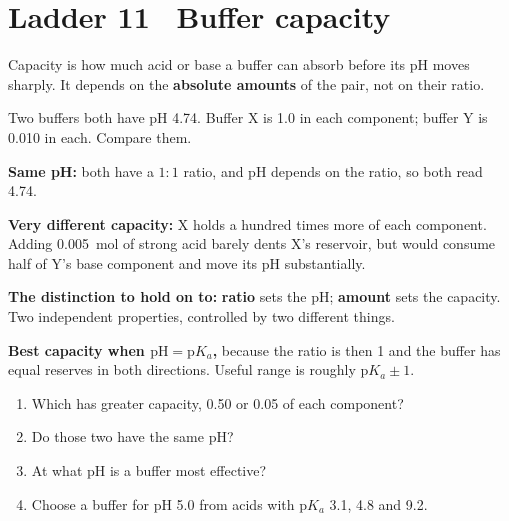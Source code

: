 \documentclass{apchem-worksheet}
\begin{document}
\section*{\sffamily Ladder 11 \textbullet\ Buffer capacity}

Capacity is how much acid or base a buffer can absorb before its pH moves
sharply. It depends on the \textbf{absolute amounts} of the pair, not on
their ratio.

\begin{workedexample}
Two buffers both have pH \num{4.74}. Buffer X is \SI{1.0}{\Molar} in each
component; buffer Y is \SI{0.010}{\Molar} in each. Compare them.

\textbf{Same pH:} both have a $1\!:\!1$ ratio, and pH depends on the
ratio, so both read \num{4.74}.

\textbf{Very different capacity:} X holds a hundred times more of each
component. Adding \SI{0.005}{\mole} of strong acid barely dents X's
reservoir, but would consume half of Y's base component and move its pH
substantially.

\textbf{The distinction to hold on to:} \textbf{ratio} sets the pH;
\textbf{amount} sets the capacity. Two independent properties, controlled
by two different things.

\textbf{Best capacity when $\text{pH} = \mathrm{p}K_a$,} because the ratio
is then 1 and the buffer has equal reserves in both directions. Useful
range is roughly $\mathrm{p}K_a \pm 1$.
\end{workedexample}

\begin{yourturn}
\begin{enumerate}[leftmargin=*,itemsep=0.5em]
  \item Which has greater capacity, \SI{0.50}{\Molar} or
        \SI{0.05}{\Molar} of each component? \workspace[1.6cm]
  \item Do those two have the same pH? \workspace[1.4cm]
  \item At what pH is a buffer most effective? \workspace[1.4cm]
  \item Choose a buffer for pH \num{5.0} from acids with
        $\mathrm{p}K_a$ \num{3.1}, \num{4.8} and \num{9.2}.
        \workspace[1.8cm]
\end{enumerate}
\end{yourturn}
\end{document}
